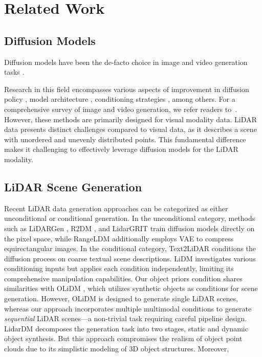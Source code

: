 \section{Related Work}
\subsection{Diffusion Models}
Diffusion models have been the de-facto choice in image and video generation tasks \cite{podell2023sdxl, gupta2024photorealistic, yang2024cogvideox}. 

Research in this field encompasses various aspects of improvement in     diffusion policy \cite{croitoru2023diffusion, liu2023flow}, model architecture \cite{bar2024lumiere,peebles2023scalable}, conditioning strategies \cite{zhang2023adding, khachatryan2023text2video}, among others.
For a comprehensive survey of image and video generation, we refer readers to~\cite{cao2024survey}. 
However, these methods are primarily designed for visual modality data. LiDAR data presents distinct challenges compared to visual data, as it describes a scene with unordered and unevenly distributed points. This fundamental difference makes it challenging to effectively leverage diffusion models for the LiDAR modality.



\subsection{LiDAR Scene Generation}

Recent LiDAR data generation approaches can be categorized as either unconditional or conditional generation. In the unconditional category, methods such as LiDARGen \cite{zyrianov2022learning}, R2DM \cite{nakashima2024lidar}, and LidarGRIT \cite{haghighi2024taming} train diffusion models directly on the pixel space, while RangeLDM additionally employs VAE \cite{kingma2013auto} to compress equirectangular images. In the conditional category, Text2LiDAR \cite{wu2024text2lidar} conditions the diffusion process on coarse textual scene descriptions. LiDM \cite{ran2024towards} investigates various conditioning inputs but applies each condition independently, limiting its comprehensive manipulation capabilities. Our object priors condition shares similarities with OLiDM \cite{yan2024olidm}, which utilizes synthetic objects as conditions for scene generation. However, OLiDM \cite{yan2024olidm} is designed to generate single LiDAR scenes, whereas our approach incorporates multiple multimodal conditions to generate \textit{sequential} LiDAR scenes—a non-trivial task requiring careful pipeline design. LidarDM \cite{zyrianov2024lidardm} decomposes the generation task into two stages, static and dynamic object synthesis. But this approach compromises the realism of object point clouds due to its simplistic modeling of 3D object structures. Moreover, 


